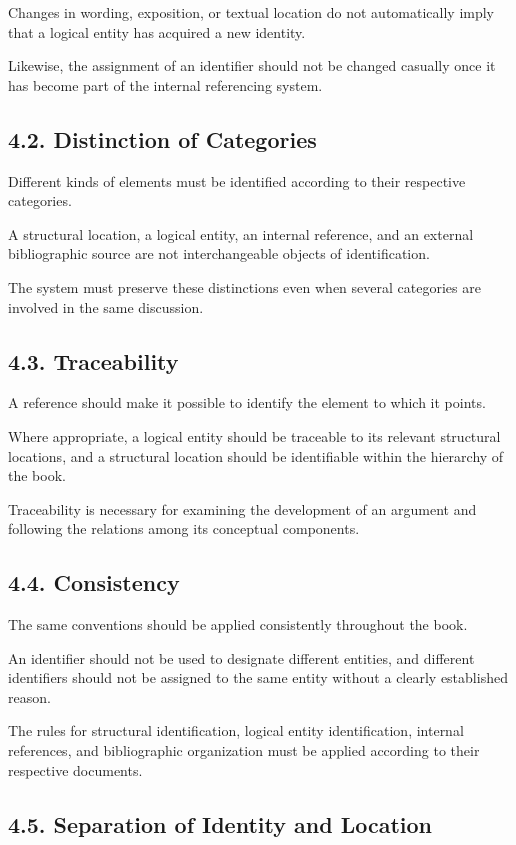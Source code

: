 Changes in wording, exposition, or textual
location do not automatically imply that a
logical entity has acquired a new identity.

Likewise, the assignment of an identifier
should not be changed casually once it has
become part of the internal referencing system.

\subsection*{4.2. Distinction of Categories}

Different kinds of elements must be identified
according to their respective categories.

A structural location, a logical entity,
an internal reference, and an external
bibliographic source are not interchangeable
objects of identification.

The system must preserve these distinctions
even when several categories are involved
in the same discussion.

\subsection*{4.3. Traceability}

A reference should make it possible to
identify the element to which it points.

Where appropriate, a logical entity should
be traceable to its relevant structural
locations, and a structural location should
be identifiable within the hierarchy of
the book.

Traceability is necessary for examining
the development of an argument and
following the relations among its
conceptual components.

\subsection*{4.4. Consistency}

The same conventions should be applied
consistently throughout the book.

An identifier should not be used to
designate different entities, and
different identifiers should not be
assigned to the same entity without
a clearly established reason.

The rules for structural identification,
logical entity identification, internal
references, and bibliographic organization
must be applied according to their
respective documents.

\subsection*{4.5. Separation of Identity and Location}

